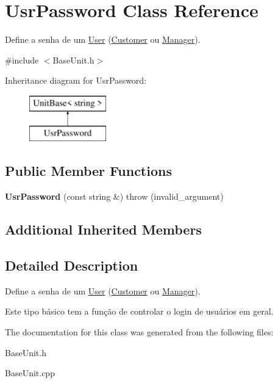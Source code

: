 \hypertarget{classUsrPassword}{\section{Usr\-Password Class Reference}
\label{classUsrPassword}
}


Define a senha de um \hyperlink{classUser}{User} (\hyperlink{classCustomer}{Customer} ou \hyperlink{classManager}{Manager}).  




{\ttfamily \#include $<$Base\-Unit.\-h$>$}

Inheritance diagram for Usr\-Password\-:\begin{figure}[H]
\begin{center}
\leavevmode
\includegraphics[height=2.000000cm]{classUsrPassword}
\end{center}
\end{figure}
\subsection*{Public Member Functions}
\begin{DoxyCompactItemize}
\item 
\hypertarget{classUsrPassword_ab99c93719778f9560712675b1febb3cb}{{\bfseries Usr\-Password} (const string \&)  throw (invalid\-\_\-argument)}\label{classUsrPassword_ab99c93719778f9560712675b1febb3cb}

\end{DoxyCompactItemize}
\subsection*{Additional Inherited Members}


\subsection{Detailed Description}
Define a senha de um \hyperlink{classUser}{User} (\hyperlink{classCustomer}{Customer} ou \hyperlink{classManager}{Manager}). 

Este tipo básico tem a função de controlar o login de usuários em geral. 

The documentation for this class was generated from the following files\-:\begin{DoxyCompactItemize}
\item 
Base\-Unit.\-h\item 
Base\-Unit.\-cpp\end{DoxyCompactItemize}
